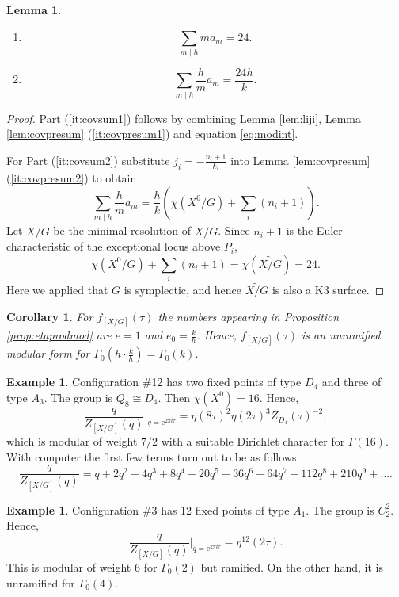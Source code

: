 \documentclass[11pt,a4paper]{amsart}
\newtheorem{lemma}[theorem]{Lemma}
\newtheorem{corollary}[theorem]{Corollary}
\theoremstyle{definition}
\newtheorem{example}[theorem]{Example}
\begin{document}
\begin{lemma}
\label{cor:covsum}
\begin{enumerate}
\item\label{it:covsum1}
\[ \sum_{m \mid h} ma_m=24. \]
\item\label{it:covsum2}
\[ \sum_{m \mid h} \frac{h}{m}a_m=\frac{24h}{k}. \]
\end{enumerate}
\end{lemma}
\begin{proof}
Part (\ref{it:covsum1}) follows by combining Lemma \ref{lem:liji}, Lemma \ref{lem:covpresum} (\ref{it:covpresum1}) and equation \eqref{eq:modint}.

For Part (\ref{it:covsum2}) substitute $j_i=-\frac{n_i+1}{k_i}$ into Lemma \ref{lem:covpresum} (\ref{it:covpresum2}) to obtain
\[ \sum_{m \mid h} \frac{h}{m}a_m= \frac{h}{k}\left( \chi(X^0/G)+\sum_{i}(n_i+1)\right). \]
Let $\widetilde{X/G}$ be the minimal resolution of $X/G$. Since $n_i+1$ is the Euler characteristic of the exceptional locus above $P_i$,
\[  \chi(X^0/G)+\sum_{i}(n_i+1)= \chi(\widetilde{X/G}) =24. \]
Here we applied that $G$ is symplectic, and hence $\widetilde{X/G}$ is also a K3 surface.
\end{proof}
\begin{corollary}
For $f_{[X/G]}(\tau)$ the numbers appearing in Proposition \ref{prop:etaprodmod} are $e=1$ and $e_0=\frac{k}{h}$. Hence,
$f_{[X/G]}(\tau)$ is an unramified modular form for $\Gamma_0\left( h \cdot \frac{k}{h} \right)=\Gamma_0(k)$.
\end{corollary}

\begin{example} Configuration \#12 has two fixed points of type $D_4$ and three of type $A_3$. The group is $Q_8 \cong D_4$. Then $\chi(X^0)=16$. Hence,
\[\frac{q}{Z_{[X/G]}(q)}\Big|_{q=\mathrm{e}^{2 \pi i \tau}}= \eta(8 \tau)^2 \eta(2 \tau)^3 Z_{D_4}(\tau)^{-2},\]
which is modular of weight $7/2$ with a suitable Dirichlet character for $\Gamma(16)$. With computer the first few terms turn out to be as follows:
\[ \frac{q}{Z_{[X/G]}(q)} = q + 2q^2 + 4q^3 + 8q^4 + 20q^5 + 36q^6 + 64q^7 + 112q^8 + 210q^9 + \dots. \]
\end{example}

\begin{example} Configuration \#3 has 12 fixed points of type $A_1$. The group is $C_2^2$. Hence,
\[\frac{q}{Z_{[X/G]}(q)}\Big|_{q=\mathrm{e}^{2 \pi i \tau}}=\eta^{12}(2\tau).\]
This is modular of weight $6$ for $\Gamma_0(2)$ but ramified. On the other hand, it is unramified for $\Gamma_0(4)$.
\end{example}
\end{document}
